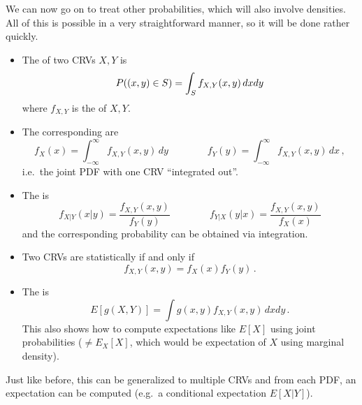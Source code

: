 We can now go on to treat other probabilities, which will also involve densities. All of this is possible in a very straightforward manner, so it will be done rather quickly.
\begin{defi}
\begin{itemize}
\item The  of two CRVs $X, Y$ is
\begin{equation}
P\qty((x, y) \in S) = \int_S f_{X, Y}(x, y) \, dx dy
\end{equation}
where $f_{X, Y}$ is the  of $X, Y$.


\item The corresponding  are
\begin{equation}
f_X(x) = \int_{- \infty}^\infty f_{X, Y}(x, y) \, dy \qquad \qquad f_Y(y) = \int_{- \infty}^\infty f_{X, Y}(x, y) \, dx \, ,
\end{equation}
i.e.~the joint PDF with one CRV \enquote{integrated out}.


\item The  is
\begin{equation}\label{eq:joint_pdf}
f_{X | Y}(x | y) = \frac{f_{X, Y}(x, y)}{f_Y(y)} \qquad \qquad f_{Y | X}(y | x) = \frac{f_{X, Y}(x, y)}{f_X(x)}
\end{equation}
and the corresponding probability can be obtained via integration.\footnotemark{}


\item Two CRVs are statistically  if and only if
\begin{equation}
f_{X, Y}(x, y) = f_X(x) f_Y(y) \, .
\end{equation}


\item The  is
\begin{equation}\label{eq:unc_stat_crv}
E[g(X, Y)] = \int g(x, y) f_{X, Y}(x, y) \, dx dy \, .
\end{equation}
This also shows how to compute expectations like $E[X]$ using joint probabilities ($\neq E_X[X]$, which would be expectation of $X$ using marginal density).%
\end{itemize}

Just like before, this can be generalized to multiple CRVs and from each PDF, an expectation can be computed (e.g.~a conditional expectation $E[X | Y]$).
\end{defi}
